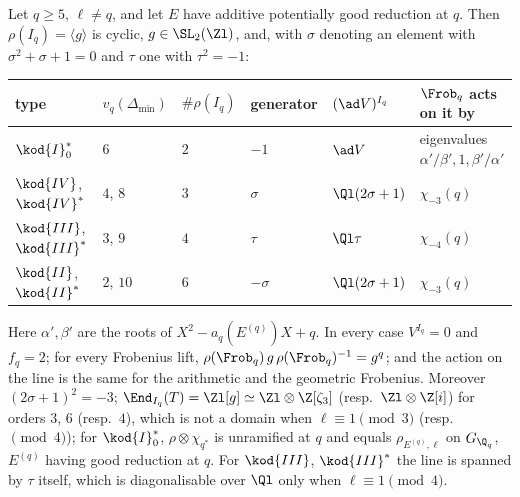 \begin{theorem}\label{thm:galrep:additive-shapes}
Let $q\ge5$, $\ell\ne q$, and let $E$ have additive potentially good reduction at $q$. Then $\rho(I_q)=\langle g\rangle$ is cyclic, $g\in\SL_2(\Zl)$, and, with
$\sigma$ denoting an element with $\sigma^2+\sigma+1=0$ and $\tau$ one with $\tau^2=-1$:
\begin{center}\small\setlength{\tabcolsep}{4pt}
\begin{tabular}{llllll}
\toprule
type & $v_q(\Delta_{\min})$ & $\#\rho(I_q)$ & generator & $(\ad V)^{I_q}$ & $\Frob_q$ acts on it by\\
\midrule
$\kod{I}_0^*$ & $6$ & $2$ & $-1$ & $\ad V$ & eigenvalues $\alpha'/\beta',1,\beta'/\alpha'$\\
$\kod{IV}$, $\kod{IV}^*$ & $4$, $8$ & $3$ & $\sigma$ & $\Ql(2\sigma+1)$ & $\chi_{-3}(q)$\\
$\kod{III}$, $\kod{III}^*$ & $3$, $9$ & $4$ & $\tau$ & $\Ql\tau$ & $\chi_{-4}(q)$\\
$\kod{II}$, $\kod{II}^*$ & $2$, $10$ & $6$ & $-\sigma$ & $\Ql(2\sigma+1)$ & $\chi_{-3}(q)$\\
\bottomrule
\end{tabular}
\end{center}
Here $\alpha',\beta'$ are the roots of $X^2-a_q(E^{(q)})X+q$. In every case $V^{I_q}=0$ and $f_q=2$; for every Frobenius lift,
$\rho(\Frob_q)\,g\,\rho(\Frob_q)^{-1}=g^q$; and the action on the line is the same for the arithmetic and the geometric Frobenius. Moreover $(2\sigma+1)^2=-3$; $\End_{I_q}(T)=\Zl[g]\simeq\Zl\otimes\Z[\zeta_3]$
(resp.\ $\Zl\otimes\Z[i]$) for orders $3$, $6$ (resp.\ $4$), which is not a domain when $\ell\equiv1\pmod3$ (resp.\ $\pmod4$); for $\kod{I}_0^*$,
$\rho\otimes\chi_{q^*}$ is unramified at $q$ and equals $\rho_{E^{(q)},\ell}$ on $G_{\Q_q}$, $E^{(q)}$ having good reduction at $q$. For $\kod{III}$, $\kod{III}^*$ the line is
spanned by $\tau$ itself, which is diagonalisable over $\Ql$ only when $\ell\equiv1\pmod4$.
\end{theorem}

